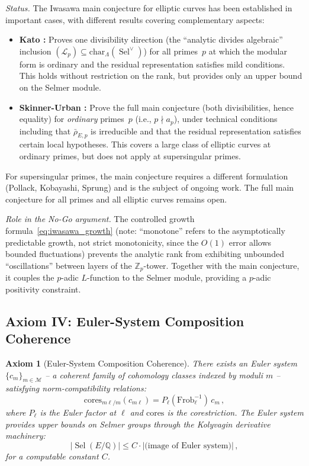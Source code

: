 \documentclass[aps,prd,twocolumn,superscriptaddress,nofootinbib]{revtex4-2}
\newtheorem{axiom}[theorem]{Axiom}
\theoremstyle{definition}
\theoremstyle{remark}
\DeclareMathOperator{\Sel}{Sel}
\begin{document}
\textit{Status.} The Iwasawa main conjecture for elliptic curves has been established in important cases, with different results covering complementary aspects:
\begin{itemize}
\item \textbf{Kato \cite{Kato2004}:} Proves one divisibility direction (the ``analytic divides algebraic'' inclusion $(\mathcal{L}_p) \subseteq \mathrm{char}_\Lambda(\Sel^\vee)$) for all primes~$p$ at which the modular form is ordinary and the residual representation satisfies mild conditions. This holds without restriction on the rank, but provides only an upper bound on the Selmer module.
\item \textbf{Skinner-Urban \cite{SkinnerUrban2014}:} Prove the full main conjecture (both divisibilities, hence equality) for \textit{ordinary} primes~$p$ (i.e., $p \nmid a_p$), under technical conditions including that $\bar{\rho}_{E,p}$ is irreducible and that the residual representation satisfies certain local hypotheses. This covers a large class of elliptic curves at ordinary primes, but does not apply at supersingular primes.
\end{itemize}
For supersingular primes, the main conjecture requires a different formulation (Pollack, Kobayashi, Sprung) and is the subject of ongoing work. The full main conjecture for all primes and all elliptic curves remains open.

\textit{Role in the No-Go argument.} The controlled growth formula~\eqref{eq:iwasawa_growth} (note: ``monotone'' refers to the asymptotically predictable growth, not strict monotonicity, since the $O(1)$ error allows bounded fluctuations) prevents the analytic rank from exhibiting unbounded ``oscillations'' between layers of the $\mathbb{Z}_p$-tower. Together with the main conjecture, it couples the $p$-adic $L$-function to the Selmer module, providing a $p$-adic positivity constraint.

\subsection{Axiom IV: Euler-System Composition Coherence}

\begin{axiom}[Euler-System Composition Coherence]
\label{ax:euler}
There exists an Euler system $\{c_m\}_{m \in \mathcal{M}}$ -- a coherent family of cohomology classes indexed by moduli $m$ -- satisfying norm-compatibility relations:
\begin{equation}
\mathrm{cores}_{m\ell/m}(c_{m\ell}) = P_\ell(\mathrm{Frob}_\ell^{-1})\, c_m\,,
\label{eq:euler_norm}
\end{equation}
where $P_\ell$ is the Euler factor at $\ell$ and $\mathrm{cores}$ is the corestriction. The Euler system provides upper bounds on Selmer groups through the Kolyvagin derivative machinery:
\begin{equation}
|\Sel(E/\mathbb{Q})| \leq C \cdot |\text{(image of Euler system)}|\,,
\end{equation}
for a computable constant $C$.
\end{axiom}
\end{document}

